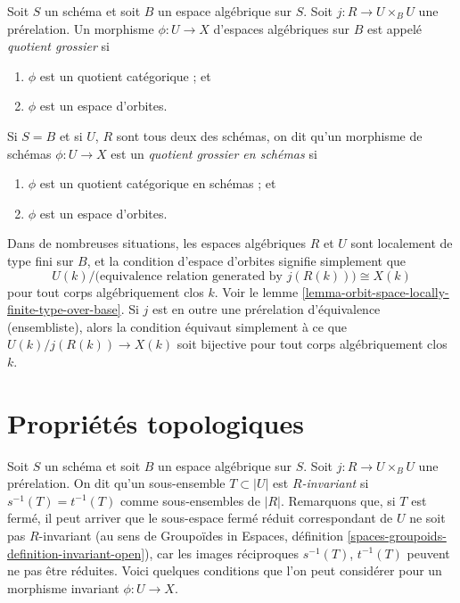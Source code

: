 \begin{definition}
\label{definition-coarse}
Soit $S$ un schéma et soit $B$ un espace algébrique sur $S$.
Soit $j : R \to U \times_B U$ une prérelation.
Un morphisme $\phi : U \to X$ d'espaces algébriques sur $B$
est appelé {\it quotient grossier} si
\begin{enumerate}
\item $\phi$ est un quotient catégorique ; et
\item $\phi$ est un espace d'orbites.
\end{enumerate}
Si $S = B$ et si $U$, $R$ sont tous deux des schémas, on dit qu'un morphisme de schémas
$\phi : U \to X$ est un {\it quotient grossier en schémas} si
\begin{enumerate}
\item $\phi$ est un quotient catégorique en schémas ; et
\item $\phi$ est un espace d'orbites.
\end{enumerate}
\end{definition}

\noindent
Dans de nombreuses situations, les espaces algébriques $R$ et $U$ sont localement de type fini
sur $B$, et la condition d'espace d'orbites signifie simplement que
$$
U(k)/\big(\text{equivalence relation generated by }j(R(k))\big)
\cong
X(k)
$$
pour tout corps algébriquement clos $k$. Voir le
lemme \ref{lemma-orbit-space-locally-finite-type-over-base}.
Si $j$ est en outre une prérelation d'équivalence (ensembliste), alors la condition
équivaut simplement à ce que $U(k)/j(R(k)) \to X(k)$ soit bijective pour tout
corps algébriquement clos $k$.









\section{Propriétés topologiques}
\label{section-topological}

\noindent
Soit $S$ un schéma et soit $B$ un espace algébrique sur $S$.
Soit $j : R \to U \times_B U$ une prérelation.
On dit qu'un sous-ensemble $T \subset |U|$ est {\it $R$-invariant} si
$s^{-1}(T) = t^{-1}(T)$ comme sous-ensembles de $|R|$.
Remarquons que, si $T$ est fermé, il peut arriver que
le sous-espace fermé réduit correspondant de $U$ ne soit pas $R$-invariant
(au sens de
Groupoïdes in Espaces, définition
\ref{spaces-groupoids-definition-invariant-open}),
car les images réciproques $s^{-1}(T)$, $t^{-1}(T)$ peuvent ne pas être réduites.
Voici quelques conditions que l'on peut considérer pour un
morphisme invariant $\phi : U \to X$.

